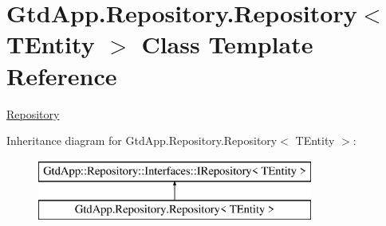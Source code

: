 \hypertarget{class_gtd_app_1_1_repository_1_1_repository}{}\section{Gtd\+App.\+Repository.\+Repository$<$ T\+Entity $>$ Class Template Reference}
\label{class_gtd_app_1_1_repository_1_1_repository}


\mbox{\hyperlink{class_gtd_app_1_1_repository_1_1_repository}{Repository}}  


Inheritance diagram for Gtd\+App.\+Repository.\+Repository$<$ T\+Entity $>$\+:\begin{figure}[H]
\begin{center}
\leavevmode
\includegraphics[height=2.000000cm]{class_gtd_app_1_1_repository_1_1_repository}
\end{center}
\end{figure}
